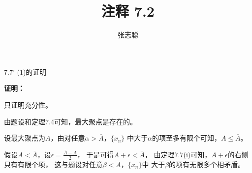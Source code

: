 \documentclass{article}
\begin{document}
\title{注释 7.2}
\author{张志聪}
\maketitle

\begin{zremark}
  7.7' (1)的证明
\end{zremark}

\textbf{证明：}

只证明充分性。

由题设和定理7.4可知，最大聚点是存在的。

设最大聚点为$A$，由对任意$\alpha > \overline{A}$，$\{x_n\}$
中大于$\alpha$的项至多有限个可知，$A \leq \overline{A}$。

假设$A < \overline{A}$，设$\epsilon = \frac{\overline{A} - A}{2}$，
于是可得$A + \epsilon < \overline{A}$，
由定理7.7(i)可知，$A + \epsilon$的右侧只有有限个项，
这与题设对任意$\beta < \overline{A}$，$\{x_n\}$中
大于$\beta$的项有无限多个相矛盾。
\end{document}
